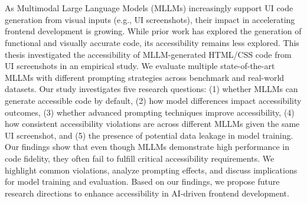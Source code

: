 \chapter{\abstractname}


As Multimodal Large Language Models (MLLMs) increasingly support 
UI code generation from visual inputs (e.g., UI screenshots), their impact 
in accelerating frontend development is growing. While prior work 
has explored the generation of functional and visually accurate code,
its accessibility remains less explored. This thesis 
investigated the accessibility of MLLM-generated HTML/CSS code from 
UI screenshots in an empirical study. We evaluate multiple 
state-of-the-art MLLMs with different prompting strategies 
across benchmark and real-world datasets. Our study investigates 
five research questions: (1) whether MLLMs can generate accessible 
code by default, (2) how model differences impact accessibility 
outcomes, (3) whether advanced prompting techniques improve 
accessibility, (4) how consistent accessibility 
violations are across different MLLMs given the same UI 
screenshot, and (5) the presence of potential data leakage
in model training. Our findings show that even though MLLMs demonstrate 
high performance in code fidelity, they often fail to fulfill 
critical accessibility requirements. We highlight common violations,
analyze prompting effects, and discuss implications for model training
and evaluation. Based on our findings, we propose future research 
directions to enhance accessibility in AI-driven frontend development.